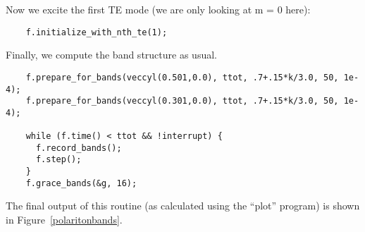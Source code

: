 Now we excite the first TE mode (we are only looking at m = 0 here):

\begin{verbatim}
    f.initialize_with_nth_te(1);
\end{verbatim}

Finally, we compute the band structure as usual.

\begin{verbatim}
    f.prepare_for_bands(veccyl(0.501,0.0), ttot, .7+.15*k/3.0, 50, 1e-4);
    f.prepare_for_bands(veccyl(0.301,0.0), ttot, .7+.15*k/3.0, 50, 1e-4);
    
    while (f.time() < ttot && !interrupt) {
      f.record_bands();
      f.step();
    }
    f.grace_bands(&g, 16);
\end{verbatim}
\begin{comment}
  }
}
\end{comment}

The final output of this routine (as calculated using the ``plot'' program)
is shown in Figure~\ref{polaritonbands}.